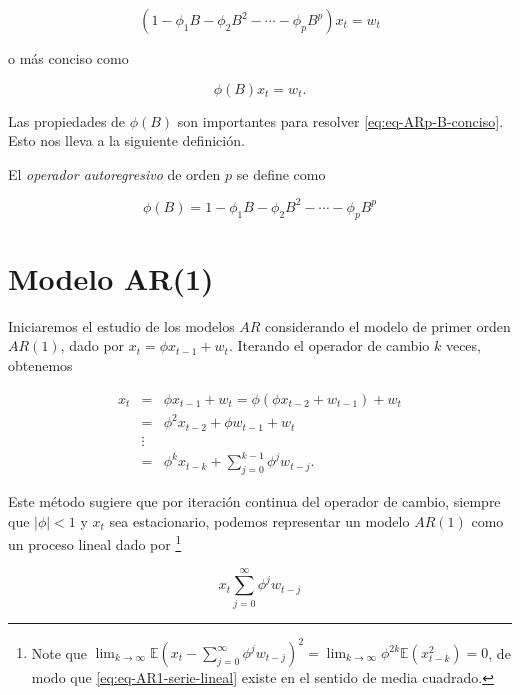 \documentclass[12pt,]{krantz}
\theoremstyle{definition}
\theoremstyle{definition}
\theoremstyle{definition}
\theoremstyle{remark}
\let\BeginKnitrBlock\begin \let\EndKnitrBlock\end
\begin{document}
\begin{equation}
(1-\phi_1B-\phi_2B^2-\cdots-\phi_pB^p)x_t=w_t
\label{eq:eqARp-operador-B}
\end{equation}

o más conciso como

\begin{equation}
\phi(B)x_t=w_t.
\label{eq:eq-ARp-B-conciso}
\end{equation}

Las propiedades de \(\phi(B)\) son importantes para resolver
\eqref{eq:eq-ARp-B-conciso}. Esto nos lleva a la siguiente definición.

\BeginKnitrBlock{definition}
\protect\hypertarget{def:defi-operador-autoregresivo}{}{\label{def:defi-operador-autoregresivo}
}El \emph{operador autoregresivo} de orden \(p\) se define como

\begin{equation}
\phi(B) = 1-\phi_1B-\phi_2B^2-\cdots-\phi_pB^p
\label{eq:eq-operador-Bp}
\end{equation}
\EndKnitrBlock{definition}

\section{Modelo AR(1)}\label{modelo-ar1}

Iniciaremos el estudio de los modelos \(AR\) considerando el modelo de
primer orden \(AR(1)\), dado por \(x_t=\phi x_{t-1}+w_t\). Iterando el
operador de cambio \(k\) veces, obtenemos

\begin{eqnarray*}
x_t &=& \phi x_{t-1}+w_t = \phi(\phi x_{t-2}+w_{t-1})+w_t \\
    &=& \phi^2x_{t-2}+\phi w_{t-1}+w_t \\
    &\vdots& \\
    &=& \phi^kx_{t-k}+\sum_{j=0}^{k-1}\phi^jw_{t-j}.
\end{eqnarray*}

Este método sugiere que por iteración continua del operador de cambio,
siempre que \(|\phi|<1\) y \(x_t\) sea estacionario, podemos representar
un modelo \(AR(1)\) como un proceso lineal dado por \footnote{Note que
  \(\lim_{k\to\infty}\mathbb{E}(x_t-\sum_{j=0}^{\infty}\phi^jw_{t-j})^2 = \lim_{k\to\infty}\phi^{2k}\mathbb{E}(x_{t-k}^2)=0\),
  de modo que \eqref{eq:eq-AR1-serie-lineal} existe en el sentido de media
  cuadrado.}

\begin{equation}
x_t \sum_{j=0}^{\infty}\phi^jw_{t-j}
\label{eq:eq-AR1-serie-lineal}
\end{equation}
\end{document}
